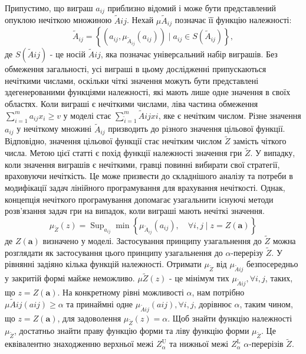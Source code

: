 \documentclass[14pt, a4paper, oneside]{extarticle}
\numberwithin{equation}{section}
\begin{document}
Припустимо, що виграш $a_{i j}$ приблизно відомий і може бути представлений опуклою нечіткою множиною $\tilde{A}{i j}$. Нехай $\mu{\tilde{A}_{i j}}$ позначає її функцію належності:
\begin{equation}
\tilde{A}_{i j}=\left\{\left(a_{i j}, \mu_{\tilde{A}_{i j}}\left(a_{i j}\right)\right) \mid a_{i j} \in S\left(\tilde{A}_{i j}\right)\right\},
\end{equation}
де $S\left(\tilde{A}{i j}\right)$ - це носій $\tilde{A}{i j}$, яка позначає універсальний набір виграшів. Без обмеження загальності, усі виграші в цьому дослідженні припускаються нечіткими числами, оскільки чіткі значення можуть бути представлені здегенерованими функціями належності, які мають лише одне значення в своїх областях. Коли виграші є нечіткими числами, ліва частина обмеження $\sum_{i=1}^{m} a_{i j} x_{i} \geq v$ у моделі стає $\sum_{\tilde{i}=1}^{m} \tilde{A}{i j} x{i}$, яке є нечітким числом. Різне значення $a_{i j}$ у нечіткому множині $\tilde{A}_{i j}$ призводить до різного значення цільової функції. Відповідно, значення цільової функції стає нечітким числом $\widetilde{Z}$ замість чіткого числа. Метою цієї статті є похід функції належності значення гри $\tilde{Z}$.
У випадку, коли значення виграшів є нечіткими, гравці повинні вибирати свої стратегії, враховуючи нечіткість. Це може призвести до складнішого аналізу та потреби в модифікації задач лінійного програмування для врахування нечіткості. Однак, концепція нечіткого програмування допомагає узагальнити існуючі методи розв'язання задач гри на випадок, коли виграші мають нечіткі значення.
\begin{equation}
\mu_{\tilde{Z}}(z)=\operatorname{Sup}_{a_{i j}} \min \left\{\mu_{\tilde{A}_{i j}}\left(a_{i j}\right), \quad \forall i, j \mid z=Z(\mathbf{a})\right\}
\end{equation}
де $Z(\mathbf{a})$ визначено у моделі. Застосування принципу узагальнення до $\tilde{Z}$ можна розглядати як застосування цього принципу узагальнення до $\alpha$-перерізу $\tilde{Z}$. У рівнянні задіяно кілька функцій належності. Отримати $\mu_{\tilde{Z}}$ від $\mu_{\tilde{A}{i j}}$ безпосередньо у закритій формі майже неможливо. $\mu{\tilde{Z}}(z)$ - це мінімум тих $\mu_{\tilde{A}{i j}}, \forall i, j$, таких, що $z=Z(\mathbf{a})$. На конкретному рівні можливості $\alpha$, нам потрібно $\mu{\tilde{A}{i j}}\left(a{i j}\right) \geq \alpha$ та принаймні одне $\mu_{\tilde{A}{i j}}\left(a{i j}\right), \forall i, j$, дорівнює $\alpha$, таким чином, що $z=Z(\mathbf{a})$, для задоволення $\mu_{\tilde{Z}}(z)=\alpha$. Щоб знайти функцію належності $\mu_{\tilde{Z}}$, достатньо знайти праву функцію форми та ліву функцію форми $\mu_{\tilde{Z}}$. Це еквівалентно знаходженню верхньої межі $Z_{\alpha}^{\mathrm{U}}$ та нижньої межі $Z_{\alpha}^{\mathrm{L}}$ $\alpha$-перерізів $\widetilde{Z}$. 
\end{document}
